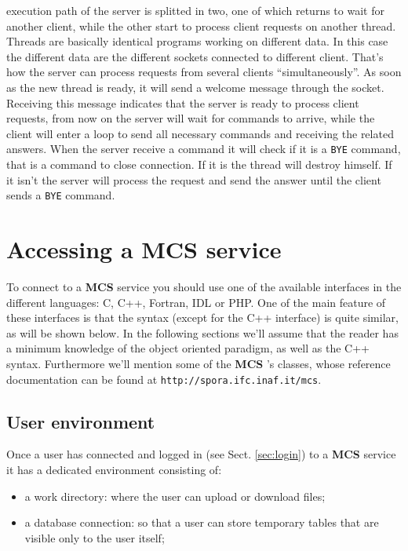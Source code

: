 \documentclass[12pt,titlepage]{book}
\newcommand{\mcs}{\textbf{MCS} }
\begin{document}
execution path of the server is splitted in two, one of which returns
to wait for another client, while the other start to process client
requests on another thread. Threads are basically identical programs
working on different data. In this case the different data are the
different sockets connected to different client. That's how the server
can process requests from several clients ``simultaneously''.
%
As soon as the new thread is ready, it will send a welcome message
through the socket. Receiving this message indicates that the server
is ready to process client requests, from now on the server will wait
for commands to arrive, while the client will enter a loop to send all
necessary commands and receiving the related answers. When the server
receive a command it will check if it is a \verb|BYE| command, that is
a command to close connection. If it is the thread will destroy
himself. If it isn't the server will process the request and send the
answer until the client sends a \verb|BYE| command.



\section{Accessing a MCS service}
To connect to a \mcs service you should use one of the available
interfaces in the different languages: C, C++, Fortran, IDL or
PHP. One of the main feature of these interfaces is that the syntax
(except for the C++ interface) is quite similar, as will be shown
below. In the following sections we'll assume that the reader has a
minimum knowledge of the object oriented paradigm, as well as the C++
syntax. Furthermore we'll mention some of the \mcs's classes, whose
reference documentation can be found at
\verb|http://spora.ifc.inaf.it/mcs|.


\subsection{User environment}
Once a user has connected and logged in (see Sect. \ref{sec:login}) to
a \mcs service it has a dedicated environment consisting of:
\begin{itemize}
\item a work directory: where the user can upload or download files;
\item a database connection: so that a user can store temporary tables
  that are visible only to the user itself;
\end{itemize}
\end{document}
